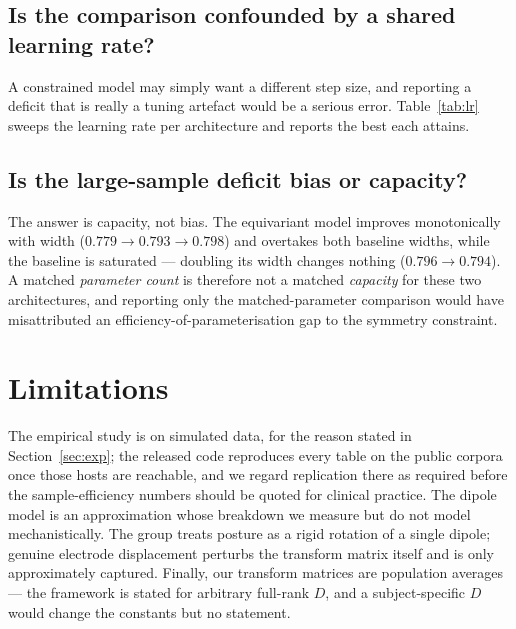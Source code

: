 \documentclass[11pt]{article}
\theoremstyle{definition}
\begin{document}
\subsection{Is the comparison confounded by a shared learning rate?}

A constrained model may simply want a different step size, and reporting a deficit
that is really a tuning artefact would be a serious error. Table~\ref{tab:lr} sweeps
the learning rate per architecture and reports the best each attains.

\begin{table}[t]\centering
\caption{Learning-rate sweep per architecture. The H1 conclusion should be read off
the \emph{best} column for each model.}
\label{tab:lr}

\end{table}

\subsection{Is the large-sample deficit bias or capacity?}

\begin{table}[t]\centering
\caption{Widening the equivariant model on the largest training set separates the two
explanations for its large-sample deficit.}
\label{tab:capacity}

\end{table}

The answer is capacity, not bias. The equivariant model improves monotonically with
width ($0.779 \to 0.793 \to 0.798$) and overtakes both baseline widths, while the
baseline is saturated --- doubling its width changes nothing ($0.796 \to 0.794$). A
matched \emph{parameter count} is therefore not a matched \emph{capacity} for these two
architectures, and reporting only the matched-parameter comparison would have
misattributed an efficiency-of-parameterisation gap to the symmetry constraint.

\section{Limitations}

The empirical study is on simulated data, for the reason stated in
Section~\ref{sec:exp}; the released code reproduces every table on the public corpora
once those hosts are reachable, and we regard replication there as required before the
sample-efficiency numbers should be quoted for clinical practice. The dipole model is
an approximation whose breakdown we measure but do not model mechanistically. The
group treats posture as a rigid rotation of a single dipole; genuine electrode
displacement perturbs the transform matrix itself and is only approximately captured.
Finally, our transform matrices are population averages --- the framework is stated for
arbitrary full-rank $D$, and a subject-specific $D$ would change the constants but no
statement.
\end{document}
